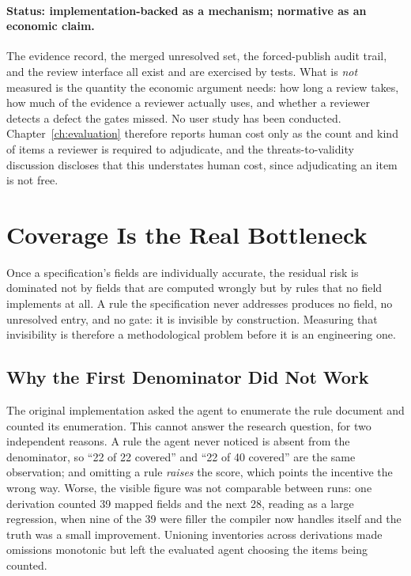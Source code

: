 \paragraph{Status: implementation-backed as a mechanism; normative as an economic claim.}
The evidence record, the merged unresolved set, the forced-publish audit trail, and the review interface
all exist and are exercised by tests. What is \emph{not} measured is the quantity the economic argument
needs: how long a review takes, how much of the evidence a reviewer actually uses, and whether a reviewer
detects a defect the gates missed. No user study has been conducted. Chapter~\ref{ch:evaluation}
therefore reports human cost only as the count and kind of items a reviewer is required to adjudicate,
and the threats-to-validity discussion discloses that this understates human cost, since adjudicating an
item is not free.

\section{Coverage Is the Real Bottleneck}
\label{sec:der:coverage}

Once a specification's fields are individually accurate, the residual risk is dominated not by fields
that are computed wrongly but by rules that no field implements at all. A rule the specification never
addresses produces no field, no unresolved entry, and no gate: it is invisible by construction.
Measuring that invisibility is therefore a methodological problem before it is an engineering one.

\subsection{Why the First Denominator Did Not Work}

The original implementation asked the agent to enumerate the rule document and counted its enumeration.
This cannot answer the research question, for two independent reasons. A rule the agent never noticed is
absent from the denominator, so ``22 of 22 covered'' and ``22 of 40 covered'' are the same observation;
and omitting a rule \emph{raises} the score, which points the incentive the wrong way. Worse, the visible
figure was not comparable between runs: one derivation counted 39 mapped fields and the next 28, reading
as a large regression, when nine of the 39 were filler the compiler now handles itself and the truth was
a small improvement. Unioning inventories across derivations made omissions monotonic but left the
evaluated agent choosing the items being counted.

